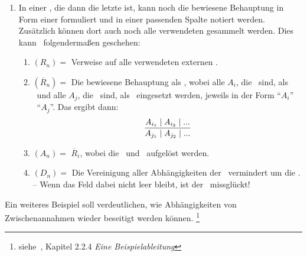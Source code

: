 {\begin{enumerate}
	Nun kann die Zeile beendet werden, oder es geht weiter mit:
	\begin{enumerate}
		\setcounter{enumii}{\value{Enumii}}%
		\item \label{item:Anwendung} $Z_n =$ Die Indizes aller $A_j$ (mit $j < i$), die eine \Voraussetzung\ der  $\overline{R}_i$ sind, möglichst in der verwendeten Reihenfolge.
		-- Für jedes angegebene $j$ werden noch die Abhängigkeiten $D_j$ den Abhängigkeiten $D_i$ hinzugefügt.
		\item $A_i =$ \Folgerung(en) der  $\overline{R}_i$.
		-- Wenn diese \Folgerungen\ schon als \Aussagen\ $A_j$ (mit $j < i$) vorhanden sind, können auch einfach deren Indizes eingetragen werden.
		Damit werden die Zusammenhänge und der Abschluss des \Beweises\ besser ersichtlich.
		\item $D_i =$ Die Verweise wurden schon in (\ref{item:Anwendung}) eingetragen.%
		\footnote{Wenn $D_n$ leer ist, dann ist $A_n$ allgemeingültig.}
	\end{enumerate}
	Der \Beweis\ muss so lange fortgeführt werden, bis alle \Folgerungen\ als \Aussagen\ in der Spalte $(A_n)$ erschienen und dort jeweils nur von den gegebenen \Voraussetzungen\ abhängig sind.
	\item \label{item:Ergebniszeile} In einer , die dann die letzte ist, kann noch die bewiesene Behauptung in Form einer  formuliert und in einer passenden Spalte notiert werden.
	Zusätzlich können dort auch noch alle verwendeten  gesammelt werden.
	Dies kann \textzB\ folgendermaßen geschehen:
	\begin{enumerate}
		\item $(R_n) =$ Verweise auf alle verwendeten externen .
		\item $(\overline{R}_n) =$ Die bewiesene Behauptung als , wobei alle $A_i$, die \Voraussetzungen\ sind, als \Voraussetzung\ und alle $A_j$, die \Folgerungen\ sind, als \Folgerung\ eingesetzt werden, jeweils in der Form \enquote{$A_i$} \textbzgl\ \enquote{$A_j$}.
		Das ergibt dann:
		\[ \frac{A_{i_1} \mid A_{i_2} \mid ...}{A_{j_1} \mid A_{j_2} \mid ...} \]
		\item $(A_n) =$ $\overline{R}_i$, wobei die \Voraussetzungen\ und \Folgerungen\ aufgelöst werden.
		\item $(D_n) =$ Die Vereinigung aller Abhängigkeiten der \Folgerungen\, vermindert um die \Voraussetzungen.
		-- Wenn das Feld dabei nicht leer bleibt, ist der \Beweis\ missglückt!
	\end{enumerate}
\end{enumerate}
%
Ein weiteres Beispiel  soll verdeutlichen, wie Abhängigkeiten von Zwischenannahmen wieder beseitigt werden können.%
\footnote{siehe~\cite{bib:NatuerlichesSchliessen},
Kapitel 2.2.4 \emph{Eine Beispielableitung}}

}
